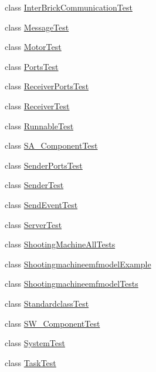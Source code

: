 \begin{DoxyCompactItemize}
class \hyperlink{classshootingmachineemfmodel_1_1tests_1_1_inter_brick_communication_test}{Inter\-Brick\-Communication\-Test}
\item 
class \hyperlink{classshootingmachineemfmodel_1_1tests_1_1_message_test}{Message\-Test}
\item 
class \hyperlink{classshootingmachineemfmodel_1_1tests_1_1_motor_test}{Motor\-Test}
\item 
class \hyperlink{classshootingmachineemfmodel_1_1tests_1_1_ports_test}{Ports\-Test}
\item 
class \hyperlink{classshootingmachineemfmodel_1_1tests_1_1_receiver_ports_test}{Receiver\-Ports\-Test}
\item 
class \hyperlink{classshootingmachineemfmodel_1_1tests_1_1_receiver_test}{Receiver\-Test}
\item 
class \hyperlink{classshootingmachineemfmodel_1_1tests_1_1_runnable_test}{Runnable\-Test}
\item 
class \hyperlink{classshootingmachineemfmodel_1_1tests_1_1_s_a___component_test}{S\-A\-\_\-\-Component\-Test}
\item 
class \hyperlink{classshootingmachineemfmodel_1_1tests_1_1_sender_ports_test}{Sender\-Ports\-Test}
\item 
class \hyperlink{classshootingmachineemfmodel_1_1tests_1_1_sender_test}{Sender\-Test}
\item 
class \hyperlink{classshootingmachineemfmodel_1_1tests_1_1_send_event_test}{Send\-Event\-Test}
\item 
class \hyperlink{classshootingmachineemfmodel_1_1tests_1_1_server_test}{Server\-Test}
\item 
class \hyperlink{classshootingmachineemfmodel_1_1tests_1_1_shooting_machine_all_tests}{Shooting\-Machine\-All\-Tests}
\item 
class \hyperlink{classshootingmachineemfmodel_1_1tests_1_1_shootingmachineemfmodel_example}{Shootingmachineemfmodel\-Example}
\item 
class \hyperlink{classshootingmachineemfmodel_1_1tests_1_1_shootingmachineemfmodel_tests}{Shootingmachineemfmodel\-Tests}
\item 
class \hyperlink{classshootingmachineemfmodel_1_1tests_1_1_standardclass_test}{Standardclass\-Test}
\item 
class \hyperlink{classshootingmachineemfmodel_1_1tests_1_1_s_w___component_test}{S\-W\-\_\-\-Component\-Test}
\item 
class \hyperlink{classshootingmachineemfmodel_1_1tests_1_1_system_test}{System\-Test}
\item 
class \hyperlink{classshootingmachineemfmodel_1_1tests_1_1_task_test}{Task\-Test}
\end{DoxyCompactItemize}
